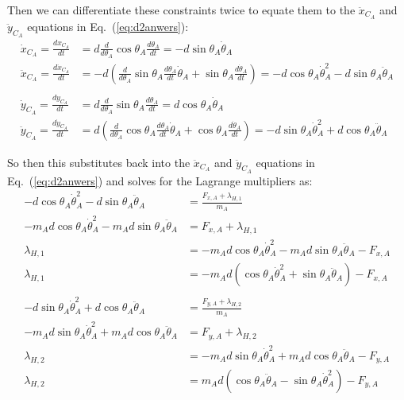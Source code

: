 \documentclass[titlepage]{article}
\begin{document}
Then we can differentiate these constraints twice to equate them to the $\ddot{x}_{C_A}$ and $\ddot{y}_{C_A}$ equations in Eq.~(\ref{eq:d2anwers}):
\begin{equation}
	\begin{split}
		\dot{x}_{C_A}=\frac{dx_{C_A}}{dt}&=d\frac{d}{d\theta_A}\cos\theta_A\frac{d\theta_A}{dt}=-d\sin\theta_A\dot{\theta}_A \\
		\ddot{x}_{C_A}=\frac{d\dot{x}_{C_A}}{dt}&=-d\left(\frac{d}{d\theta_A}\sin\theta_A\frac{d\theta_A}{dt}\dot{\theta}_A+\sin\theta_A\frac{d\dot{\theta}_A}{dt}\right)=-d\cos\theta_A\dot{\theta}_A^2-d\sin\theta_A\ddot{\theta}_A \\
		\\
		\dot{y}_{C_A}=\frac{dy_{C_A}}{dt}&=d\frac{d}{d\theta_A}\sin\theta_A\frac{d\theta_A}{dt}=d\cos\theta_A\dot{\theta}_A \\
		\ddot{y}_{C_A}=\frac{d\dot{y}_{C_A}}{dt}&=d\left(\frac{d}{d\theta_A}\cos\theta_A\frac{d\theta_A}{dt}\dot{\theta}_A+\cos\theta_A\frac{d\dot{\theta}_A}{dt}\right)=-d\sin\theta_A\dot{\theta}_A^2+d\cos\theta_A\ddot{\theta}_A
	\end{split}
	\label{eq:constraintderivative}
\end{equation}

So then this substitutes back into the $\ddot{x}_{C_A}$ and $\ddot{y}_{C_A}$ equations in Eq.~(\ref{eq:d2anwers}) and solves for the Lagrange multipliers as:
\begin{equation}
	\begin{split}
		-d\cos\theta_A\dot{\theta}_A^2-d\sin\theta_A\ddot{\theta}_A&=\frac{F_{x,A}+\lambda_{H,1}}{m_A} \\
		-m_Ad\cos\theta_A\dot{\theta}_A^2-m_Ad\sin\theta_A\ddot{\theta}_A&=F_{x,A}+\lambda_{H,1} \\
		\lambda_{H,1}&=-m_Ad\cos\theta_A\dot{\theta}_A^2-m_Ad\sin\theta_A\ddot{\theta}_A-F_{x,A} \\
		\lambda_{H,1}&=-m_Ad\left(\cos\theta_A\dot{\theta}_A^2+\sin\theta_A\ddot{\theta}_A\right)-F_{x,A} \\
		\\
		-d\sin\theta_A\dot{\theta}_A^2+d\cos\theta_A\ddot{\theta}_A&=\frac{F_{y,A}+\lambda_{H,2}}{m_A} \\
		-m_Ad\sin\theta_A\dot{\theta}_A^2+m_Ad\cos\theta_A\ddot{\theta}_A&=F_{y,A}+\lambda_{H,2} \\
		\lambda_{H,2}&=-m_Ad\sin\theta_A\dot{\theta}_A^2+m_Ad\cos\theta_A\ddot{\theta}_A-F_{y,A} \\
		\lambda_{H,2}&=m_Ad\left(\cos\theta_A\ddot{\theta}_A-\sin\theta_A\dot{\theta}_A^2\right)-F_{y,A}
	\end{split}
\end{equation}
\end{document}
